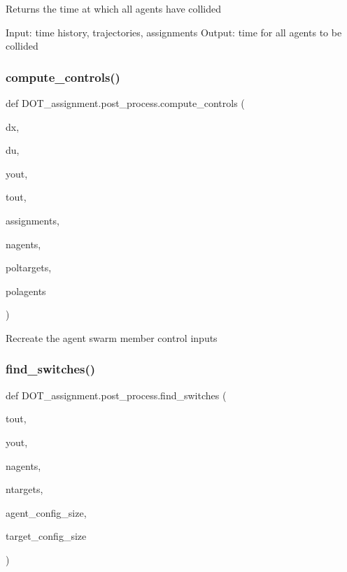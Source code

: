 \begin{DoxyVerb}Returns the time at which all agents have collided

Input: time history, trajectories, assignments
Output: time for all agents to be collided\end{DoxyVerb}
 \mbox{\label{namespace_d_o_t__assignment_1_1post__process_af8fe6cab30c1341f46b034bb6ba1b0f7}} 
\subsubsection{\texorpdfstring{compute\_controls()}{compute\_controls()}}
{\footnotesize\ttfamily def D\+O\+T\+\_\+assignment.\+post\+\_\+process.\+compute\+\_\+controls (\begin{DoxyParamCaption}\item[{}]{dx,  }\item[{}]{du,  }\item[{}]{yout,  }\item[{}]{tout,  }\item[{}]{assignments,  }\item[{}]{nagents,  }\item[{}]{poltargets,  }\item[{}]{polagents }\end{DoxyParamCaption})}

\begin{DoxyVerb}Recreate the agent swarm member control inputs\end{DoxyVerb}
 \mbox{\label{namespace_d_o_t__assignment_1_1post__process_a272aa83b0082e05aa34510531ee99d03}} 
\subsubsection{\texorpdfstring{find\_switches()}{find\_switches()}}
{\footnotesize\ttfamily def D\+O\+T\+\_\+assignment.\+post\+\_\+process.\+find\+\_\+switches (\begin{DoxyParamCaption}\item[{}]{tout,  }\item[{}]{yout,  }\item[{}]{nagents,  }\item[{}]{ntargets,  }\item[{}]{agent\+\_\+config\+\_\+size,  }\item[{}]{target\+\_\+config\+\_\+size }\end{DoxyParamCaption})}

